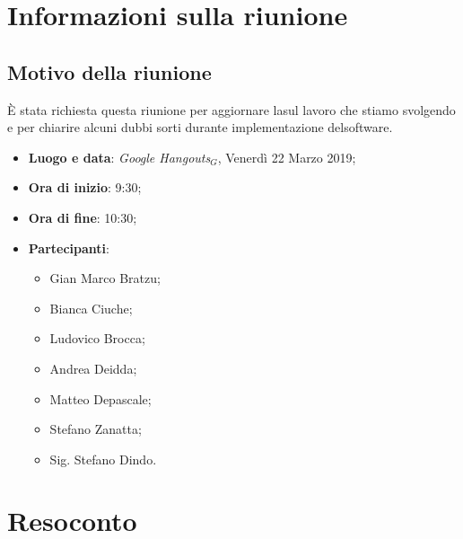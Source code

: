 \documentclass[a4paper,12pt]{article}
\begin{document}
	\tableofcontents
	\cleardoublepage
	\section{Informazioni sulla riunione}
	\subsection{Motivo della riunione}\`{E} stata richiesta questa riunione per aggiornare lasul lavoro che stiamo svolgendo e per chiarire alcuni dubbi sorti durante implementazione delsoftware.
	
	\begin{itemize}
		\item \textbf{Luogo e data}: \textit{Google Hangouts$_{G}$}, Venerdì 22 Marzo 2019;
		\item \textbf{Ora di inizio}: 9:30;
		\item \textbf{Ora di fine}: 10:30;
		\item \textbf{Partecipanti}:  
		\begin{itemize}
			\item Gian Marco Bratzu;
			\item Bianca Ciuche;
			\item Ludovico Brocca;
			\item Andrea Deidda;
			\item Matteo Depascale;
			\item Stefano Zanatta;
			\item Sig. Stefano Dindo.
		\end{itemize}
	\end{itemize}
	
	\section{Resoconto}
\end{document}
